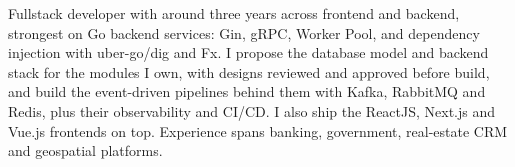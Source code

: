 \documentclass[11pt,a4paper,sans]{moderncv}
\begin{document}
\makecvtitle


\vspace{6pt}
\small{Fullstack developer with around three years across frontend and backend, strongest on Go backend services: Gin, gRPC, Worker Pool, and dependency injection with uber-go/dig and Fx. I propose the database model and backend stack for the modules I own, with designs reviewed and approved before build, and build the event-driven pipelines behind them with Kafka, RabbitMQ and Redis, plus their observability and CI/CD. I also ship the ReactJS, Next.js and Vue.js frontends on top. Experience spans banking, government, real-estate CRM and geospatial platforms.}

\end{document}
